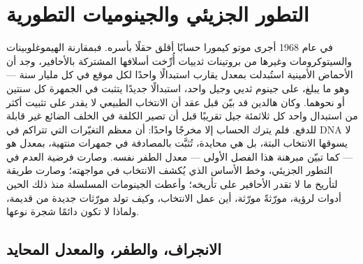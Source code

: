 \chapter{التطور الجزيئي والجينوميات التطورية}\label{ch:b3:molecular-evolution}

في عام 1968 أجرى موتو كيمورا حسابًا أقلق حقلًا بأسره. فبمقارنة
الهيموغلوبينات والسيتوكرومات وغيرها من بروتينات ثدييات
أُرِّخت أسلافها المشتركة بالأحافير، وجد أن الأحماض الأمينية
استُبدلت بمعدل يقارب استبدالًا واحدًا لكل موقع في كل مليار
سنة --- وهو ما يبلغ، على جينوم ثديي وجيل واحد، استبدالًا
جديدًا يتثبت في الجمهرة كل سنتين أو نحوهما. وكان هالدين قد
بيّن قبل عقد أن الانتخاب الطبيعي لا يقدر على تثبيت أكثر من
استبدال واحد كل ثلاثمئة جيل تقريبًا قبل أن تصير الكلفة في
الخلف الضائع غير قابلة للدفع. فلم يترك الحساب إلا مخرجًا
واحدًا: أن معظم التغيّرات التي تتراكم في DNA لا يسوقها
الانتخاب البتة، بل هي محايدة، تُثبَّت بالمصادفة في جمهرات
منتهية، بمعدل هو --- كما تبيّن مبرهنة هذا الفصل الأولى ---
معدل الطفر نفسه. وصارت  فرضية العدم في
التطور الجزيئي، وخط الأساس الذي يُكشف الانتخاب في مواجهته؛
وصارت  طريقة لتأريخ ما لا تقدر الأحافير على
تأريخه؛ وأعطت الجينومات المسلسلة منذ ذلك الحين أدوات لرؤية،
مورّثةً مورّثة، أين عمل الانتخاب، وكيف تولد مورّثات جديدة من
قديمة، ولماذا لا تكون  دائمًا شجرة نوعها.

\section{الانجراف، والطفر، والمعدل المحايد}

